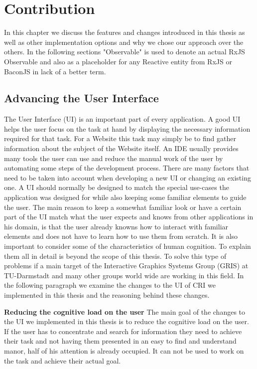 \chapter{Contribution}
In this chapter we discuss the features and changes introduced in this thesis as well as other implementation options and why we chose our approach over the others.
In the following sections "Observable" is used to denote an actual RxJS Observable and also as a placeholder for any Reactive entity from RxJS or BaconJS in lack of a better term.

\section{Advancing the User Interface}
The User Interface (UI) is an important part of every application. A good UI helps the user focus on the task at hand by displaying the necessary information required for that task. For a Website this task may simply be to find gather information about the subject of the Website itself. An IDE usually provides many tools the user can use and reduce the manual work of the user by automating some steps of the development process. There are many factors that need to be taken into account when developing a new UI or changing an existing one. A UI should normally be designed to match the special use-cases the application was designed for while also keeping some familiar elements to guide the user. The main reason to keep a somewhat familiar look or have a certain part of the UI match what the user expects and knows from other applications in his domain, is that the user already knowns how to interact with familiar elements and does not have to learn how to use them from scratch. It is also important to consider some of the characteristics of human cognition. To explain them all in detail is beyond the scope of this thesis. To solve this type of problems if a main target of the Interactive Graphics Systems Group (GRIS) at TU-Darmstadt and many other groups world wide are working in this field. In the following paragraph we examine the changes to the UI of CRI we implemented in this thesis and the reasoning behind these changes.
  
\textbf{Reducing the cognitive load on the user}
The main goal of the changes to the UI we implemented in this thesis is to reduce the cognitive load on the user. If the user has to concentrate and search for information they need to achieve their task and not having them presented in an easy to find and understand manor, half of his attention is already occupied. It can not be used to work on the task and achieve their actual goal.

